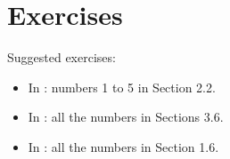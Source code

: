 \section{Exercises}

Suggested exercises:

\begin{itemize}
\item In \cite{McO}: numbers 1 to 5 in Section 2.2.
\item In \cite{PinRub}: all the numbers in Sections 3.6. 
\item In \cite{Str}: all the numbers in Section 1.6.
\end{itemize}

